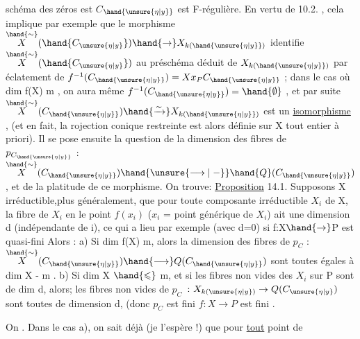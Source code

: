schéma des zéros est $C$$_{\hand{\unsure{\eta|y}}}$ \unsure{;|,} est F-régulière. En vertu de 10.2. , cela
implique par exemple que le morphisme  $\overset{\hand{\sim}}{X}(\hand{C_{\unsure{\eta|y}}})\hand{\to} X_{k(\hand{\unsure{\eta|y}})}$ identifie $\overset{\hand{\sim}}{X}(\hand{C_{\unsure{\eta|y}}})$ au préschéma
déduit de $X_{k(\hand{\unsure{\eta|y}})}$ par éclatement de $f^{-1}(C_{\hand{\unsure{\eta|y}}})= Xx_P C_{\hand{\unsure{\eta|y}}}$ ;   dans le cas
où  dim f(X) \hand{$\leqslant$} m ,  on  aura même  $f^{-1}(C_{\hand{\unsure{\eta|y}}}) = \hand{\emptyset}$ , et  par suite
$\overset{\hand{\sim}}{X}(C_{\hand{\unsure{\eta|y}}}) \hand{\xrightarrow{\sim}} X_{k(\hand{\unsure{\eta|y}})}$  est un \uline{isomorphisme} , (et en fait, la rojection conique
restreinte  est alors définie sur X tout entier à priori). Il se pose
ensuite la question de la dimension des fibres de $p_{C_{\hand{\unsure{\eta|y}}}}$ : $\overset{\hand{\sim}}{X}(C_{\hand{\unsure{\eta|y}}}) \hand{\unsure{\longrightarrow|\relbar}} \hand{Q}(C_{\hand{\unsure{\eta|y}}})$,
et de la platitude de ce morphisme. On trouve:
\uline{Proposition} 14.1.   Supposons X irréductible,plus
généralement, que  pour toute composante irréductible $X_i$ de X, la fibre
de $X_i$ en le point $f(x_i)$  ($x_i$ = point générique de $X_i$) ait une dimension d
(indépendante de i), ce qui a lieu par exemple (avec d=0) si f:X$\hand{\to}$P est quasi-fini\hand{,} \placedmargin{}
Alors :     a)  Si  dim f(X) \hand{$>$} m, alors la dimension  des fibres de
$p_C$  : $\overset{\hand{\sim}}{X}(C_{\hand{\unsure{\eta|y}}}) \hand{\longrightarrow} Q(C_{\hand{\unsure{\eta|y}}})$  sont toutes égales à  dim X - m .   b)  Si dim X
$\hand{\leqslant}$ m, et si les fibres non vides des $X_i$ sur P sont  de dim d, alors; les fibres non vides de $p_C$ $\colon X_{k(\unsure{\eta|y})}\to Q(C_{\unsure{\eta|y}})$ sont toutes de dimension d,  (donc $p_C$ est fini   $f\colon X\to P$ est fini \hand{]}.

On 
. Dans le cas a), 
 on sait déjà (je l'espère !) que pour \uline{tout}  point  de

